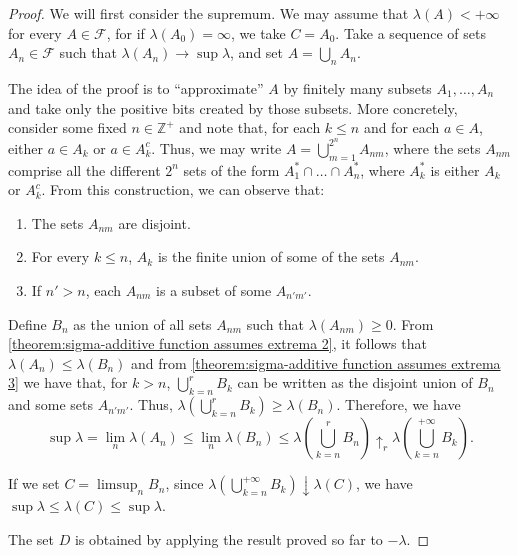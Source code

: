 \begin{proof} We will first consider the supremum. We may assume that
\(\lambda(A)<+\infty\) for every \(A\in\mathcal{F}\), for if \(\lambda(A_0)=\infty\), we
take \(C=A_0\). Take a sequence of sets \(A_n\in\mathcal{F}\) such that
\(\lambda(A_n)\to\sup\lambda\), and set \(A=\bigcup_nA_n\).
	
	The idea of the proof is to ``approximate'' \(A\) by finitely many subsets
\(A_1,\dots,A_n\) and take only the positive bits created by those subsets. More
concretely, consider some fixed \(n\in\mathbb{Z}^+\) and note that, for each \(k\leq n\)
and for each \(a\in A\), either \(a\in A_k\) or \(a\in A_k^c\). Thus, we may
write \(A=\bigcup_{m=1}^{2^n}A_{nm}\), where the sets \(A_{nm}\) comprise all
the different \(2^n\) sets of the form \(A_1^*\cap\dots\cap A_n^*\), where
\(A_k^*\) is either \(A_k\) or \(A_k^c\). From this construction, we can observe
that:
	
	\begin{enumerate}
		\item \label{theorem:sigma-additive function assumes extrema 1} The
sets \(A_{nm}\) are disjoint.
		\item \label{theorem:sigma-additive function assumes extrema 2} For
every \(k\leq n\), \(A_k\) is the finite union of some of the sets \(A_{nm}\).
		\item \label{theorem:sigma-additive function assumes extrema 3} If
\(n'>n\), each \(A_{nm}\) is a subset of some \(A_{n'm'}\).
	\end{enumerate}
	
	Define \(\displaystyle B_n\) as the union of all sets \(A_{nm}\) such that
\(\lambda(A_{nm})\geq0\). From \ref{theorem:sigma-additive function assumes
extrema 2}, it follows that \(\lambda(A_n)\leq\lambda(B_n)\) and from
\ref{theorem:sigma-additive function assumes extrema 3} we have that, for
\(k>n\), \(\displaystyle\bigcup_{k=n}^rB_k\) can be written as the disjoint
union of \(B_n\) and some sets \(A_{n'm'}\). Thus,
\(\lambda(\bigcup_{k=n}^{r}B_k)\geq\lambda(B_n)\). Therefore, we have
	\[ \sup\lambda=\lim_n\lambda(A_n)\leq\lim_n\lambda(B_n)\leq\lambda\left(\bigcup_{k=n}^{r}B_n\right)\uparrow_{r}\lambda\left(\bigcup_{k=n}^{+\infty}B_k\right).
	\]
	
	If we set \(C=\limsup_nB_n\), since
\(\lambda\left(\bigcup_{k=n}^{+\infty}B_k\right)\downarrow\lambda(C)\), we have
\(\sup\lambda\leq\lambda(C)\leq\sup\lambda\).
	
	The set \(D\) is obtained by applying the result proved so far to
\(-\lambda\).
\end{proof}

